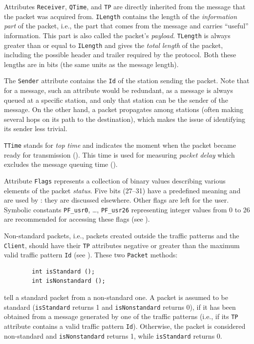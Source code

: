 Attributes {\tt Receiver}, {\tt QTime}, and {\tt TP} are directly inherited
from the message that the packet was acquired from.
{\tt ILength} contains the length of the {\em information part\/} of the
packet, i.e., the part that comes from the message and carries ``useful''
information.
This part is also called the packet's {\em payload}.
{\tt TLength} is always greater than or equal to {\tt ILength} and
gives the {\em total length\/} of the packet, including the possible header and
trailer required by the protocol.
Both these lengths are in bits (the same units as the message length).

The {\tt Sender} attribute contains the {\tt Id} of the station sending the
packet.
Note that for a message, such an attribute would be redundant, as a message is
always queued at a specific station, and only that station can be the sender
of the message.
On the other hand, a packet propagates among stations (often
making several hops on its path to the destination), which makes the
issue of identifying its sender less trivial.

{\tt TTime} stands for {\em top time\/} and indicates the moment when the
packet became ready for transmission ().
This time is used for measuring {\em packet delay\/} which excludes the message
queuing time ().

Attribute {\tt Flags} represents a collection of binary values describing
various elements of the packet {\em status}.
Five bits (27--31) have a predefined meaning and are used by \smurph: they are
discussed elsewhere.
Other flags are left for the user.
Symbolic constants {\tt PF\_usr0}, \ldots , {\tt PF\_usr26}
representing integer values from 0 to 26 are recommended for accessing
these flags (see ).

Non-standard packets, i.e.,
packets created outside the traffic patterns and the
{\tt Client}, should have their {\tt TP} attributes negative or greater
than the maximum valid traffic pattern {\tt Id} (see ).
These two {\tt Packet} methods:
\begin{verbatim}
        int isStandard ();
        int isNonstandard ();
\end{verbatim}
tell a standard packet from a non-standard one.
A packet is assumed to be standard ({\tt isStandard} returns 1 and
{\tt isNonstandard} returns 0), if it has
been obtained from a
message generated by one of the traffic patterns (i.e.,
if its {\tt TP} attribute
contains a valid traffic pattern {\tt Id}).
Otherwise, the packet is considered non-standard and {\tt isNonstandard}
returns 1, while {\tt isStandard} returns 0.


